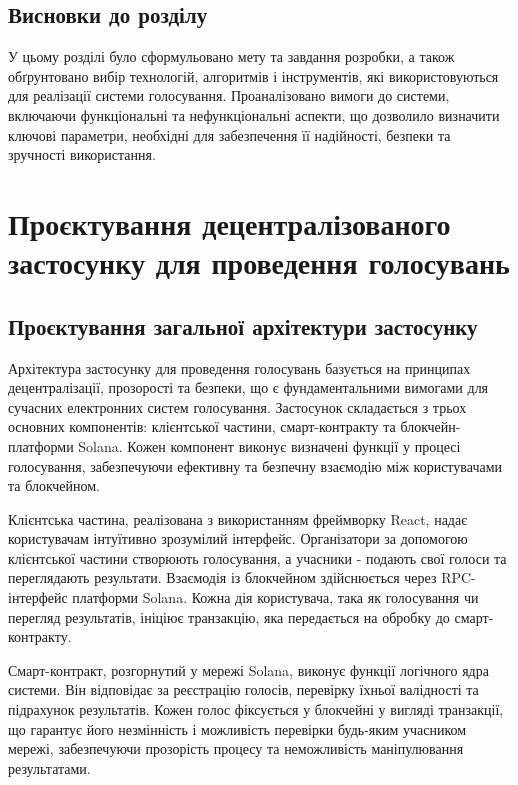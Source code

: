 \documentclass[14pt]{extreport}
\begin{document}
  \section{Висновки до розділу}
  
  У цьому розділі було сформульовано мету та завдання розробки, а також обґрунтовано вибір технологій, алгоритмів і інструментів, які використовуються для реалізації системи голосування. Проаналізовано вимоги до системи, включаючи функціональні та нефункціональні аспекти, що дозволило визначити ключові параметри, необхідні для забезпечення її надійності, безпеки та зручності використання.

  \chapter{Проєктування децентралізованого застосунку для проведення голосувань}

  \section{Проєктування загальної архітектури застосунку}
  
  Архітектура застосунку для проведення голосувань базується на принципах децентралізації, прозорості та безпеки, що є фундаментальними вимогами для сучасних електронних систем голосування. Застосунок складається з трьох основних компонентів: клієнтської частини, смарт-контракту та блокчейн-платформи Solana. Кожен компонент виконує визначені функції у процесі голосування, забезпечуючи ефективну та безпечну взаємодію між користувачами та блокчейном.

  Клієнтська частина, реалізована з використанням фреймворку React, надає користувачам інтуїтивно зрозумілий інтерфейс. Організатори за допомогою клієнтської частини створюють голосування, а учасники - подають свої голоси та переглядають результати. Взаємодія із блокчейном здійснюється через RPC-інтерфейс платформи Solana. Кожна дія користувача, така як голосування чи перегляд результатів, ініціює транзакцію, яка передається на обробку до смарт-контракту.

  Смарт-контракт, розгорнутий у мережі Solana, виконує функції логічного ядра системи. Він відповідає за реєстрацію голосів, перевірку їхньої валідності та підрахунок результатів. Кожен голос фіксується у блокчейні у вигляді транзакції, що гарантує його незмінність і можливість перевірки будь-яким учасником мережі, забезпечуючи прозорість процесу та неможливість маніпулювання результатами.
\end{document}
